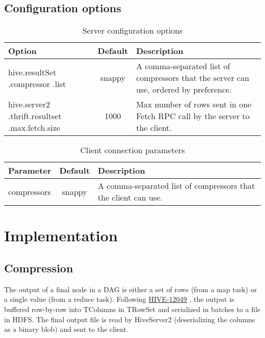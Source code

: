\documentclass[11pt,a4paper]{article}
\begin{document}
	\subsection{Configuration options}
		\begin{table}[H]
			\begin{tabular}{| p{3cm} | c | p{6.5cm} |} \hline
				\textbf{Option} & \textbf{Default} & \textbf{Description} \\ \hline
				hive.resultSet\linebreak
				.compressor\linebreak
				.list
				& snappy & A comma-separated list of compressors that the server can use, ordered by preference.
				\\ \hline
				hive.server2\linebreak
				.thrift.resultset\linebreak
				.max.fetch.size
				& 1000 & Max number of rows sent in one Fetch RPC call by the server to the client.
				\\ \hline
			\end{tabular}
			\caption{Server configuration options}
		\end{table}

		\begin{table}[H]
			\begin{tabular}{| p{3cm} | c | p{6.5cm} |} \hline
				\textbf{Parameter} & \textbf{Default} & \textbf{Description} \\ \hline
				compressors
				& snappy & A comma-separated list of compressors that the client can use. 
				\\ \hline
			\end{tabular}
			\caption{Client connection parameters}
		\end{table}
		
\section{Implementation}
	
	\subsection{Compression}
		The output of a final node in a DAG is either a set of rows (from a map task) or a single value (from a reduce task).
		Following
		\href{https://issues.apache.org/jira/browse/HIVE-12049}{HIVE-12049}
		, the output is buffered row-by-row into TColumns in TRowSet and serialized in batches to a file in HDFS.
		The final output file is read by HiveServer2 (deserializing the columns as a binary blob) and sent to the client.
		
\end{document}
